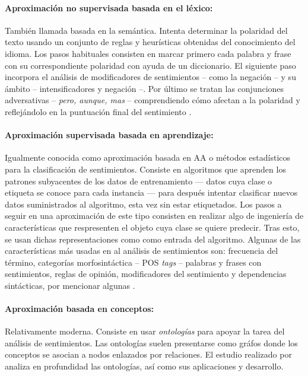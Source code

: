 \paragraph{Aproximación no supervisada basada en el léxico:} También llamada
basada en la semántica. Intenta determinar la polaridad del texto usando un
conjunto de reglas y heurísticas obtenidas del conocimiento del idioma. Los
pasos habituales consisten en marcar primero cada palabra y frase con su
correspondiente polaridad con ayuda de un diccionario. El siguiente paso
incorpora el análisis de modificadores de sentimientos -- como la negación -- y
su ámbito -- intensificadores y negación --. Por último se tratan las
conjunciones adversativas -- \emph{pero, aunque, mas} -- comprendiendo cómo
afectan a la polaridad y reflejándolo en la puntuación final del sentimiento
\cite{Liu2012}.


\paragraph{Aproximación supervisada basada en aprendizaje:}Igualmente conocida
como aproximación basada en \ac{AA} o métodos estadísticos para la clasificación
de sentimientos. Consiste en algoritmos que aprenden los patrones subyacentes de
los datos de entrenamiento --- datos cuya clase o etiqueta se conoce para cada
instancia --- para después intentar clasificar nuevos datos suministrados al
algoritmo, esta vez sin estar etiquetados. Los pasos a seguir en una
aproximación de este tipo consisten en realizar algo de ingeniería de
características que respresenten el objeto cuya clase se quiere predecir. Tras
esto, se usan dichas representaciones como como entrada del algoritmo. Algunas
de las características más usadas en al análisis de sentimientos son: frecuencia
del término, categorías morfosintáctica -- \ac{POS} \emph{tags} -- palabras y
frases con sentimientos, reglas de opinión,  modificadores del sentimiento y
dependencias sintácticas, por mencionar algunas \cite{Liu2012}.


\paragraph{Aproximación basada en conceptos:}Relativamente moderna. Consiste en
usar \emph{ontologías} para apoyar la tarea del
análisis de sentimientos. Las ontologías suelen presentarse como gráfos donde
los conceptos se asocian a nodos enlazados por relaciones. El estudio realizado
por \citet{Zhou2007} analiza en profundidad las ontologías, así como sus
aplicaciones y desarrollo.

